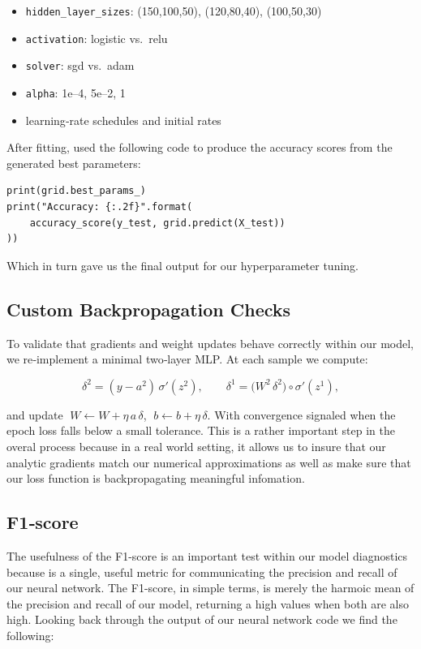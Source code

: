\begin{itemize}
  \item \texttt{hidden\_layer\_sizes}: (150,100,50), (120,80,40), (100,50,30)
  \item \texttt{activation}: logistic vs.\ relu
  \item \texttt{solver}: sgd vs.\ adam
  \item \texttt{alpha}: 1e–4, 5e–2, 1
  \item learning‐rate schedules and initial rates
\end{itemize}

After fitting, used the following code to produce the accuracy scores from the generated best parameters:
\begin{verbatim}
print(grid.best_params_)
print("Accuracy: {:.2f}".format(
    accuracy_score(y_test, grid.predict(X_test))
))
\end{verbatim}
Which in turn gave us the final output for our hyperparameter tuning.
\subsection{Custom Backpropagation Checks}
To validate that gradients and weight updates behave correctly within our model, we re‐implement a minimal two‐layer MLP.  
At each sample we compute:

\[
\delta^2 = (y - a^2)\,\sigma'(z^2), 
\qquad
\delta^1 = \bigl(W^2\,\delta^2\bigr)\circ\sigma'(z^1),
\]

and update  
\(\;W \gets W + \eta\,a\,\delta\),  
\(\;b \gets b + \eta\,\delta\).  
With convergence signaled when the epoch loss falls below a small tolerance.
This is a rather important step in the overal process because in a real world setting, it allows us to insure that our analytic gradients match our numerical approximations as well as make sure that our loss function is backpropagating meaningful infomation.

\subsection{F1‐score}
The usefulness of the F1-score is an important test within our model diagnostics because is a single, useful metric for communicating the precision and recall of our neural network.
The F1-score, in simple terms, is merely the harmoic mean of the precision and recall of our model, returning a high values when both are also high.
Looking back through the output of our neural network code we find the following:

